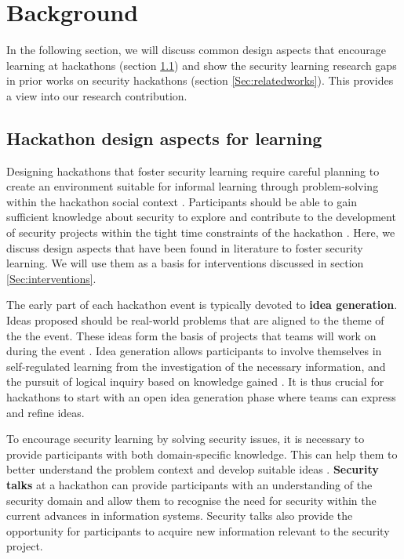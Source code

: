 \documentclass[runningheads]{llncs}
\begin{document}
\section{Background}
In the following section, we will discuss common design aspects that encourage learning at hackathons (section \ref{Sec:designaspects}) and show the security learning research gaps in prior works on security hackathons (section \ref{Sec:relatedworks}). This provides a view into our research contribution.

\subsection{Hackathon design aspects for learning}\label{Sec:designaspects}
Designing hackathons that foster security learning require careful planning to create an environment suitable for informal learning through problem-solving within the hackathon social context \cite{case2004between}. Participants should be able to gain sufficient knowledge about security to explore and contribute to the development of security projects within the tight time constraints of the hackathon \cite{kollwitz2019hack}.
Here, we discuss design aspects that have been found in literature to foster security learning. We will use them as a basis for interventions discussed in section \ref{Sec:interventions}.

The early part of each hackathon event is typically devoted to \textbf{idea generation}. Ideas proposed should be real-world problems that are aligned to the theme of the the event. These ideas form the basis of projects that teams will work on during the event \cite{stoyanov2007effect}. Idea generation allows participants to involve themselves in self-regulated learning from the investigation of the necessary information, and the pursuit of logical inquiry based on knowledge gained \cite{akcay2009problem}. It is thus crucial for hackathons to start with an open idea generation phase \cite{bohmer2015open} where teams can express and refine ideas. 

To encourage security learning by solving security issues, it is necessary to provide participants with both domain-specific knowledge. This can help them to better understand the problem context and develop suitable ideas \cite{stoyanov2007effect}.
\textbf{Security talks} at a hackathon can provide participants with an understanding of the security domain and allow them to recognise the need for security within the current advances in information systems. Security talks also provide the opportunity for participants to acquire new information \cite{horton2018project} relevant to the security project.
\end{document}
